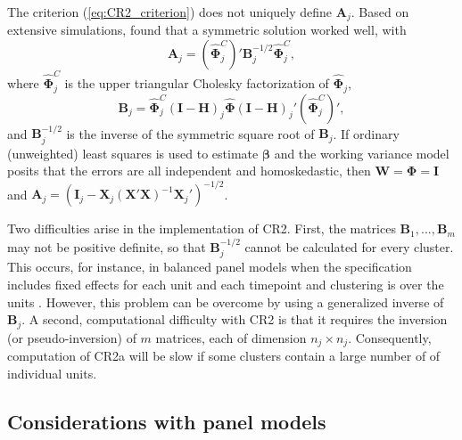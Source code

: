 \documentclass[12pt]{article}\usepackage[]{graphicx}\usepackage[]{color}
\newcommand{\bm}{\mathbf}
\newcommand{\bs}{\boldsymbol}
\begin{document}
The criterion (\ref{eq:CR2_criterion}) does not uniquely define $\bm{A}_j$. 
Based on extensive simulations, \citet{McCaffrey2001generalizations} found that a symmetric solution worked well, with 
\begin{equation}
\label{eq:CR2_adjustment}
\bm{A}_j = \left(\hat{\bs\Phi}_j^C\right)' \bm{B}_j^{-1/2}\hat{\bs\Phi}_j^C,
\end{equation}
where $\hat{\bs\Phi}_j^C$ is the upper triangular Cholesky factorization of $\hat{\bs\Phi}_j$, 
\begin{equation}
\label{eq:CR2_Bmatrix}
\bm{B}_j = \hat{\bs\Phi}_j^C\left(\bm{I} - \bm{H}\right)_j \hat{\bs\Phi} \left(\bm{I} - \bm{H}\right)_j' \left(\hat{\bs\Phi}_j^C\right)',
\end{equation}
and $\bm{B}_j^{-1/2}$ is the inverse of the symmetric square root of $\bm{B}_j $. 
If ordinary (unweighted) least squares is used to estimate $\bs\beta$ and the working variance model posits that the errors are all independent and homoskedastic, then $\bm{W} = \bs\Phi = \bm{I}$ and $\bm{A}_j = \left(\bm{I}_j - \bm{X}_j\left(\bm{X}'\bm{X}\right)^{-1}\bm{X}_j'\right)^{-1/2}$.

Two difficulties arise in the implementation of CR2.
First, the matrices $\bm{B}_1,...,\bm{B}_m$ may not be positive definite, so that $\bm{B}_j^{-1/2}$ cannot be calculated for every cluster. 
This occurs, for instance, in balanced panel models when the specification includes fixed effects for each unit and each timepoint and clustering is over the units \citep[p. 320]{Angrist2009mostly}. 
However, this problem can be overcome by using a generalized inverse of $\bm{B}_j$.
A second, computational difficulty with CR2 is that it requires the inversion (or pseudo-inversion) of $m$ matrices, each of dimension $n_j \times n_j$. 
Consequently, computation of CR2a will be slow if some clusters contain a large number of of individual units. 

\subsection{Considerations with panel models}
\end{document}
